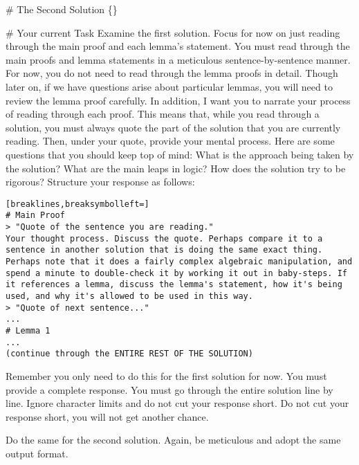 \begin{tcolorbox}[breakable,title=Comparison Prompt 1]
\# The Second Solution
\{\}

\# Your current Task
Examine the first solution. Focus for now on just reading through the main proof and each lemma's statement. You must read through the main proofs and lemma statements in a meticulous sentence-by-sentence manner. For now, you do not need to read through the lemma proofs in detail. Though later on, if we have questions arise about particular lemmas, you will need to review the lemma proof carefully. In addition, I want you to narrate your process of reading through each proof. This means that, while you read through a solution, you must always quote the part of the solution that you are currently reading. Then, under your quote, provide your mental process. Here are some questions that you should keep top of mind: What is the approach being taken by the solution? What are the main leaps in logic? How does the solution try to be rigorous?
Structure your response as follows:

\begin{Verbatim}[breaklines,breaksymbolleft=]
# Main Proof
> "Quote of the sentence you are reading."
Your thought process. Discuss the quote. Perhaps compare it to a sentence in another solution that is doing the same exact thing. Perhaps note that it does a fairly complex algebraic manipulation, and spend a minute to double-check it by working it out in baby-steps. If it references a lemma, discuss the lemma's statement, how it's being used, and why it's allowed to be used in this way.
> "Quote of next sentence..."
...
# Lemma 1
...
(continue through the ENTIRE REST OF THE SOLUTION)
\end{Verbatim}

Remember you only need to do this for the first solution for now.
You must provide a complete response. You must go through the entire solution line by line.
Ignore character limits and do not cut your response short. Do not cut your response short, you will not get another chance.
\end{tcolorbox}

\begin{tcolorbox}[breakable,title=Comparison Prompt 2]
Do the same for the second solution. Again, be meticulous and adopt the same output format.
\end{tcolorbox}


